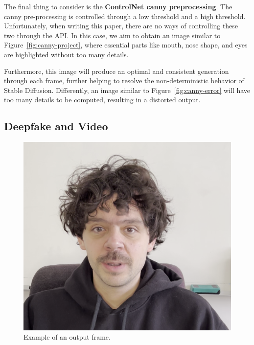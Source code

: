 \documentclass[sn-mathphys,Numbered]{sn-jnl}
\theoremstyle{thmstyleone}%
\theoremstyle{thmstyletwo}%
\theoremstyle{thmstylethree}%
\begin{document}
The final thing to consider is the \textbf{ControlNet canny preprocessing}. 
The canny pre-processing is controlled through a low threshold and a high threshold. 
Unfortunately, when writing this paper, there are no ways of  controlling these two through the API.
In this case, we aim to obtain an image similar to Figure~\ref{fig:canny-project},  where essential parts like mouth, nose shape, and eyes are highlighted without too many details. 

Furthermore, this image will produce an optimal and consistent generation through each frame, further helping to resolve the non-deterministic behavior of Stable Diffusion. Differently, an image similar to Figure~\ref{fig:canny-error} will have too many details to be computed, 
resulting in a distorted output.



\subsection{Deepfake and Video}

\begin{figure}[t]
	\centering
	\includegraphics[scale=0.15, keepaspectratio]{img/project_img/output.png}
	\caption{Example of an output frame.}
	\label{fig:output}
\end{figure}
\end{document}
